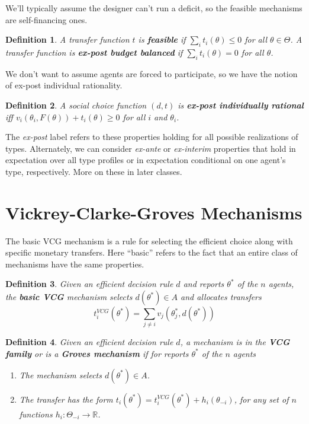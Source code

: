 \documentclass[letter, 10pt]{article}
\theoremstyle{basic}
\newtheorem{definition}{Definition}[section]
\newcommand{\R}{\mathbb{R}}
\begin{document}
\begin{spacing}{1.0}
We'll typically assume the designer can't run a deficit, so the feasible
mechanisms are self-financing ones.

\begin{definition}
  A transfer function $t$ is \textbf{feasible} if $\sum_i t_i(\theta) \leq
  0$ for all $\theta \in \Theta$. A transfer function is \textbf{ex-post
    budget balanced} if $\sum_i t_i(\theta) = 0$ for all $\theta$.
\end{definition}

We don't want to assume agents are forced to participate, so we have the
notion of ex-post individual rationality.

\begin{definition}
  A social choice function $(d,t)$ is \textbf{ex-post
    individually rational} iff $v_i(\theta_i,F(\theta))+
  t_i(\theta) \geq 0$ for all $i$ and $\theta_i$.
\end{definition}

The \textit{ex-post} label refers to these properties holding for all
possible realizations of types. Alternately, we can consider
\textit{ex-ante} or \textit{ex-interim} properties that hold in expectation
over all type profiles or in expectation conditional on one agent's type,
respectively. More on these in later classes.

\section{Vickrey-Clarke-Groves Mechanisms}
\label{sec:vickr-clarke-grov}

The basic VCG mechanism is a rule for selecting the efficient choice along
with specific monetary transfers. Here ``basic'' refers to the fact that an
entire class of mechanisms have the same properties.

\begin{definition}
  Given an efficient decision rule $d$ and reports $\theta^*$ of the $n$
  agents, the \textbf{basic VCG} mechanism selects $d(\theta^*)\in A$ and
  allocates transfers \[t_i^{VCG}(\theta^*)=\sum_{j\neq i}
  v_j(\theta_j^*,d(\theta^*))\]
\end{definition}

\begin{definition}
  Given an efficient decision rule $d$, a mechanism is in the \textbf{VCG
    family} or is a \textbf{Groves mechanism} if for reports $\theta^*$ of
  the $n$ agents
  \begin{enumerate}
  \item The mechanism selects $d(\theta^*) \in A$.
  \item The transfer has the form $t_i(\theta^*) = t_i^{VCG}(\theta^*)
    + h_i(\theta_{-i})$, for any set of $n$
    functions $h_i:\Theta_{-i} \to \R$.
  \end{enumerate}
\end{definition}


\end{spacing}
\end{document}

